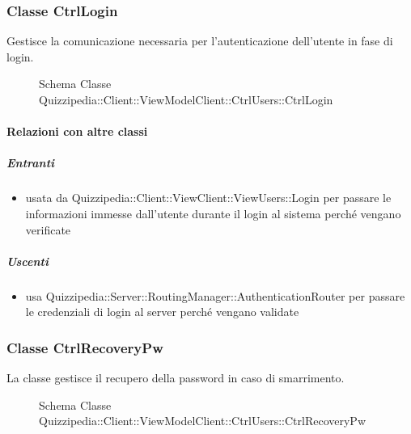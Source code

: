 \subsubsection{Classe CtrlLogin}
Gestisce la comunicazione necessaria per l'autenticazione dell'utente in fase di login.
\begin{figure}[H]
\centering
\noindent{}
\caption[Schema Classe CtrlLogin]{Schema Classe Quizzipedia::Client::ViewModelClient::CtrlUsers::CtrlLogin}
\end{figure}
\paragraph{Relazioni con altre classi}
\subparagraph{Entranti}
\begin{itemize}
\item usata da Quizzipedia::Client::ViewClient::ViewUsers::Login per passare le informazioni immesse dall'utente durante il login al sistema perché vengano verificate
\end{itemize}
\subparagraph{Uscenti}
\begin{itemize}
\item usa Quizzipedia::Server::RoutingManager::AuthenticationRouter per passare le credenziali di login al server perché vengano validate
\end{itemize}
\subsubsection{Classe CtrlRecoveryPw}
La classe gestisce il recupero della password in caso di smarrimento.
\begin{figure}[H]
\centering
\noindent{}
\caption[Schema Classe CtrlRecoveryPw]{Schema Classe Quizzipedia::Client::ViewModelClient::CtrlUsers::CtrlRecoveryPw}
\end{figure}
